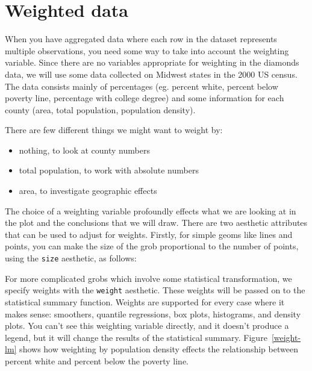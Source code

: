 \section{Weighted data}
\label{sec:weighting}


When you have aggregated data where each row in the dataset represents multiple observations, you need some way to take into account the weighting variable.  Since there are no variables appropriate for weighting in the diamonds data, we will use some data collected on Midwest states in the 2000 US census.  The data consists mainly of percentages (eg. percent white, percent below poverty line, percentage with college degree) and some information for each county (area, total population, population density).

There are few different things we might want to weight by: 

\begin{itemize}
	\item nothing, to look at county numbers
	\item total population, to work with absolute numbers
	\item area, to investigate geographic effects
\end{itemize}

\noindent The choice of a weighting variable profoundly effects what we are looking at in the plot and the conclusions that we will draw.  There are two aesthetic attributes that can be used to adjust for weights.  Firstly, for simple geoms like lines and points, you can make the size of the grob proportional to the number of points, using the {\tt size} aesthetic, as follows:

%


For more complicated grobs which involve some statistical transformation, we specify weights with the {\tt weight} aesthetic.  These weights will be passed on to the statistical summary function.  Weights are supported for every case where it makes sense: smoothers, quantile regressions, box plots, histograms, and density plots.  You can't see this weighting variable directly, and it doesn't produce a legend, but it will change the results of the statistical summary.  Figure~\ref{weight-lm} shows how weighting by population density effects the relationship between percent white and percent below the poverty line.

